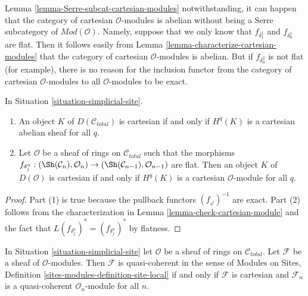 \begin{remark}[Warning]
\label{remark-warning-cartesian-modules}
Lemma \ref{lemma-Serre-subcat-cartesian-modules} notwithstanding, it
can happen that the category of cartesian $\mathcal{O}$-modules is
abelian without being a Serre subcategory of $\textit{Mod}(\mathcal{O})$.
Namely, suppose that we only know that
$f_{\delta_1^1}$ and $f_{\delta_0^1}$ are flat.
Then it follows easily from
Lemma \ref{lemma-characterize-cartesian-modules}
that the category of cartesian $\mathcal{O}$-modules is abelian.
But if $f_{\delta_0^2}$ is not flat (for example),
there is no reason for the inclusion functor
from the category of cartesian $\mathcal{O}$-modules
to all $\mathcal{O}$-modules to be exact.
\end{remark}

\begin{lemma}
\label{lemma-derived-cartesian-modules}
In Situation \ref{situation-simplicial-site}.
\begin{enumerate}
\item An object $K$ of $D(\mathcal{C}_{total})$ is cartesian if and only
if $H^q(K)$ is a cartesian abelian sheaf for all $q$.
\item Let $\mathcal{O}$ be a sheaf
of rings on $\mathcal{C}_{total}$ such that the morphisms
$f_{\delta^n_j} : (\Sh(\mathcal{C}_n), \mathcal{O}_n)
\to (\Sh(\mathcal{C}_{n - 1}), \mathcal{O}_{n - 1})$ are flat.
Then an object $K$ of $D(\mathcal{O})$ is cartesian if and only
if $H^q(K)$ is a cartesian $\mathcal{O}$-module for all $q$.
\end{enumerate}
\end{lemma}

\begin{proof}
Part (1) is true because the pullback functors $(f_\varphi)^{-1}$
are exact. Part (2) follows from the characterization in
Lemma \ref{lemma-check-cartesian-module}
and the fact that $L(f_{\delta^n_j})^* = (f_{\delta^n_j})^*$
by flatness.
\end{proof}

\begin{lemma}
\label{lemma-quasi-coherent-sheaf}
In Situation \ref{situation-simplicial-site}
let $\mathcal{O}$ be a sheaf of rings on $\mathcal{C}_{total}$.
Let $\mathcal{F}$ be a sheaf of $\mathcal{O}$-modules.
Then $\mathcal{F}$ is quasi-coherent in the sense of
Modules on Sites, Definition \ref{sites-modules-definition-site-local}
if and only if $\mathcal{F}$ is cartesian
and $\mathcal{F}_n$ is a quasi-coherent $\mathcal{O}_n$-module for all $n$.
\end{lemma}

